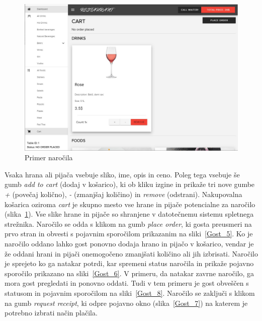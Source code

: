 \documentclass[a4paper, 12pt]{book}
\begin{document}
\begin{figure}[!htb]
\begin{center}
\includegraphics[width=13.7cm]{customer_2.jpg}
\caption{Primer naročila}
\label{Gost_4}
\end{center}
\end{figure}


Vsaka hrana ali pijača vsebuje sliko, ime, opis in ceno. Poleg tega vsebuje še gumb \textit{add to cart} (dodaj v košarico), ki ob kliku izgine in prikaže tri nove gumbe \textit{+} (povečaj količno), \textit{-} (zmanjšaj količino) in \textit{remove} (odstrani). Nakupovalna košarica oziroma \textit{cart} je skupno mesto vse hrane in pijače potencialne za naročilo (slika~\ref{Gost_4}). Vse slike hrane in pijače so shranjene v datotečnemu sistemu spletnega strežnika.
Naročilo se odda s klikom na gumb \textit{place order}, ki gosta preusmeri na prvo stran in obvesti s pojavnim sporočilom prikazanim na sliki~\ref{Gost_5}. Ko je naročilo oddano lahko gost ponovno dodaja hrano in pijačo v košarico, vendar je že oddani hrani in pijači onemogočeno zmanjšati količino ali jih izbrisati. Naročilo je sprejeto ko ga natakar potrdi, kar spremeni status naročila in prikaže pojavno sporočilo prikazano na sliki~\ref{Gost_6}. V primeru, da natakar zavrne naročilo, ga mora gost pregledati in ponovno oddati. Tudi v tem primeru je gost obveščen s statusom in pojavnim sporočilom na sliki~\ref{Gost_8}. Naročilo se zaključi s klikom na gumb \textit{request receipt}, ki odpre pojavno okno (slika~\ref{Gost_7}) na katerem je potrebno izbrati način plačila.
\end{document}
